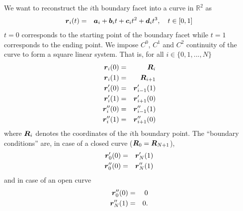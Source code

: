 We want to reconstruct the $i$th boundary facet into a curve in $\mathbb{R}^2$ as
\begin{eqnarray}
\boldsymbol{r}_i(t) &=& \boldsymbol{a}_i + \boldsymbol{b}_i t + \boldsymbol{c}_it^2 + \boldsymbol{d}_it^3, \quad t \in [0,1]
\end{eqnarray}
$t=0$ corresponds to the starting point of the boundary facet while $t=1$ corresponds to the ending point. We impose $C^0$, $C^1$ and $C^2$ continuity of the curve to form a square linear system. That is, for all $i \in \{0,1,...,N\}$
\begin{eqnarray}
\boldsymbol{r}_i(0) &=& \boldsymbol{R}_i \\
\boldsymbol{r}_i(1) &=& \boldsymbol{R}_{i+1} \\
\boldsymbol{r}_i'(0) &=& \boldsymbol{r}_{i-1}'(1) \\
\boldsymbol{r}_i'(1) &=& \boldsymbol{r}_{i+1}'(0) \\
\boldsymbol{r}_i''(0) &=& \boldsymbol{r}_{i-1}''(1) \\
\boldsymbol{r}_i''(1) &=& \boldsymbol{r}_{i+1}''(0)
\end{eqnarray}
where $\boldsymbol{R}_i$ denotes the coordinates of the $i$th boundary point. The ``boundary conditions'' are, in case of a closed curve ($\boldsymbol{R}_0 = \boldsymbol{R}_{N+1}$),
\begin{eqnarray}
\boldsymbol{r}_0'(0) &=& \boldsymbol{r}_N'(1) \\
\boldsymbol{r}_0''(0) &=& \boldsymbol{r}_N''(1) \\
\end{eqnarray}
and in case of an open curve
\begin{eqnarray}
\boldsymbol{r}_0''(0) &=& 0 \\
\boldsymbol{r}_N''(1) &=& 0.
\end{eqnarray}

